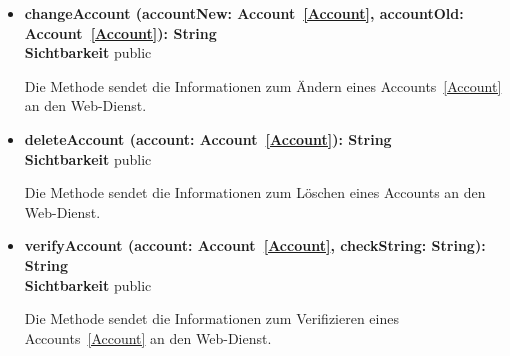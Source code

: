 \begin{itemize}
\item \textbf{changeAccount (accountNew: Account~\eqref{Account}, accountOld: Account~\eqref{Account}): String}\hfill\\
\textbf{Sichtbarkeit} public

Die Methode sendet die Informationen zum Ändern eines Accounts~\eqref{Account} an den Web-Dienst.

\item \textbf{deleteAccount (account: Account~\eqref{Account}): String}\hfill\\
\textbf{Sichtbarkeit} public

Die Methode sendet die Informationen zum Löschen eines Accounts an den Web-Dienst.

\item \textbf{verifyAccount (account: Account~\eqref{Account}, checkString: String): String}\hfill\\
\textbf{Sichtbarkeit} public

Die Methode sendet die Informationen zum Verifizieren eines Accounts~\eqref{Account} an den Web-Dienst.

\end{itemize}